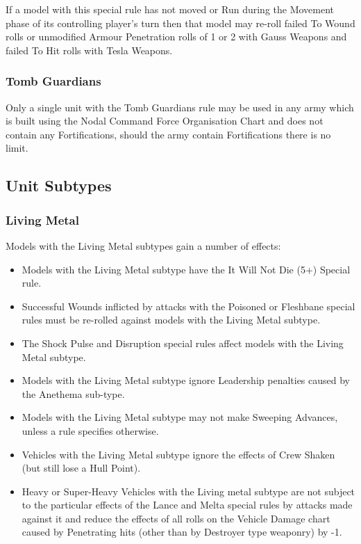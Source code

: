 \begin{multicols}{2}
If a model with this special rule has not moved or Run during the Movement phase of its controlling player’s turn then that model may re-roll failed To Wound rolls or unmodified Armour Penetration rolls of 1 or 2 with Gauss Weapons and failed To Hit rolls with Tesla Weapons.

\subsubsection{Tomb Guardians} \label{Tomb Guardians}

Only a single unit with the Tomb Guardians rule may be used in any army which is built using the Nodal Command Force Organisation Chart and does not contain any Fortifications, should the army contain Fortifications there is no limit.

\end{multicols}

\subsection{Unit Subtypes}

\subsubsection{Living Metal} \label{Living Metal}

Models with the Living Metal subtypes gain a number of effects:

\begin{itemize}
	\item Models with the Living Metal subtype have the It Will Not Die (5+) Special rule.
	\item Successful Wounds inflicted by attacks with the Poisoned or Fleshbane special rules must be re-rolled against models with the Living Metal subtype.
	\item The Shock Pulse and Disruption special rules affect models with the Living Metal subtype.
	\item Models with the Living Metal subtype ignore Leadership penalties caused by the Anethema sub-type.
	\item Models with the Living Metal subtype may not make Sweeping Advances, unless a rule specifies otherwise.
\end{itemize} 

\begin{itemize}
	\item Vehicles with the Living Metal subtype ignore the effects of Crew Shaken (but still lose a Hull Point).
	\item Heavy or Super-Heavy Vehicles with the Living metal subtype are not subject to the particular effects of the Lance and Melta special rules by attacks made against it and reduce the effects of all rolls on the Vehicle Damage chart caused by Penetrating hits (other than by Destroyer type weaponry) by -1.
\end{itemize} 

